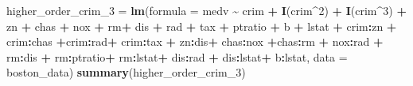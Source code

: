 \documentclass[
]{article}
\newenvironment{Shaded}{\begin{snugshade}}{\end{snugshade}}
\newcommand{\AttributeTok}[1]{\textcolor[rgb]{0.13,0.29,0.53}{#1}}
\newcommand{\DecValTok}[1]{\textcolor[rgb]{0.00,0.00,0.81}{#1}}
\newcommand{\FunctionTok}[1]{\textcolor[rgb]{0.13,0.29,0.53}{\textbf{#1}}}
\newcommand{\NormalTok}[1]{#1}
\newcommand{\OtherTok}[1]{\textcolor[rgb]{0.56,0.35,0.01}{#1}}
\newcommand{\SpecialCharTok}[1]{\textcolor[rgb]{0.81,0.36,0.00}{\textbf{#1}}}
\begin{document}
\begin{Shaded}
\begin{Highlighting}[]
\NormalTok{higher\_order\_crim\_3 }\OtherTok{=} \FunctionTok{lm}\NormalTok{(}\AttributeTok{formula =}\NormalTok{ medv }\SpecialCharTok{\textasciitilde{}}\NormalTok{ crim }\SpecialCharTok{+} \FunctionTok{I}\NormalTok{(crim}\SpecialCharTok{\^{}}\DecValTok{2}\NormalTok{) }\SpecialCharTok{+} \FunctionTok{I}\NormalTok{(crim}\SpecialCharTok{\^{}}\DecValTok{3}\NormalTok{) }\SpecialCharTok{+}\NormalTok{ zn }\SpecialCharTok{+}\NormalTok{ chas }\SpecialCharTok{+}\NormalTok{ nox }\SpecialCharTok{+}\NormalTok{ rm}\SpecialCharTok{+}\NormalTok{ dis }\SpecialCharTok{+}\NormalTok{ rad }\SpecialCharTok{+}\NormalTok{ tax }\SpecialCharTok{+}\NormalTok{ ptratio }\SpecialCharTok{+}\NormalTok{ b }\SpecialCharTok{+}\NormalTok{ lstat }\SpecialCharTok{+}\NormalTok{ crim}\SpecialCharTok{:}\NormalTok{zn }\SpecialCharTok{+}\NormalTok{ crim}\SpecialCharTok{:}\NormalTok{chas  }\SpecialCharTok{+}\NormalTok{crim}\SpecialCharTok{:}\NormalTok{rad}\SpecialCharTok{+}\NormalTok{ crim}\SpecialCharTok{:}\NormalTok{tax }\SpecialCharTok{+}\NormalTok{ zn}\SpecialCharTok{:}\NormalTok{dis}\SpecialCharTok{+}\NormalTok{ chas}\SpecialCharTok{:}\NormalTok{nox }\SpecialCharTok{+}\NormalTok{chas}\SpecialCharTok{:}\NormalTok{rm }\SpecialCharTok{+}\NormalTok{ nox}\SpecialCharTok{:}\NormalTok{rad }\SpecialCharTok{+}\NormalTok{ rm}\SpecialCharTok{:}\NormalTok{dis }\SpecialCharTok{+}\NormalTok{ rm}\SpecialCharTok{:}\NormalTok{ptratio}\SpecialCharTok{+}\NormalTok{ rm}\SpecialCharTok{:}\NormalTok{lstat}\SpecialCharTok{+}\NormalTok{ dis}\SpecialCharTok{:}\NormalTok{rad }\SpecialCharTok{+}\NormalTok{ dis}\SpecialCharTok{:}\NormalTok{lstat}\SpecialCharTok{+}\NormalTok{ b}\SpecialCharTok{:}\NormalTok{lstat, }\AttributeTok{data =}\NormalTok{ boston\_data)}
\FunctionTok{summary}\NormalTok{(higher\_order\_crim\_3)}
\end{Highlighting}
\end{Shaded}
\end{document}

